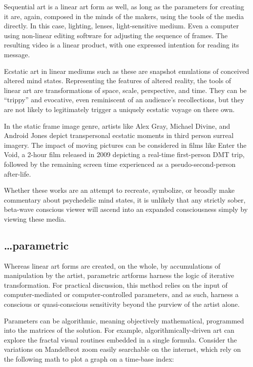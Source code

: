 \documentclass{UIdahoMastersThesis}
\begin{document}
Sequential art is a linear art form as well, as long as the parameters for creating it are, again, composed in the minds of the makers, using the tools of the media directly. In this case, lighting, lenses, light-sensitive medium. Even a computer using non-linear editing software for adjusting the sequence of frames. The resulting video is a linear product, with one expressed intention for reading its message.

Ecstatic art in linear mediums such as these are snapshot emulations of conceived altered mind states. Representing the features of altered reality, the tools of linear art are transformations of space, scale, perspective, and time. They can be ``trippy'' and evocative, even reminiscent of an audience's recollections, but they are not likely to legitimately trigger a uniquely ecstatic voyage on there own.  

In the static frame image genre, artists like Alex Gray, Michael Divine, and Android Jones depict transpersonal ecstatic moments in third person surreal imagery. The impact of moving pictures can be considered in films like Enter the Void, a 2-hour film released in 2009 depicting a real-time first-person DMT trip, followed by the remaining screen time experienced as a pseudo-second-person after-life.

Whether these works are an attempt to recreate, symbolize, or broadly make commentary about psychedelic mind states, it is unlikely that any strictly sober, beta-wave conscious viewer will ascend into an expanded consciousness simply by viewing these media.

\subsection*{\ldots parametric}

Whereas linear art forms are created, on the whole, by accumulations of manipulation by the artist, parametric artforms harness the logic of iterative transformation. For practical discussion, this method relies on the input of computer-mediated or computer-controlled parameters, and as such, harness a conscious or quasi-conscious sensitivity beyond the purview of the artist alone. 

Parameters can be algorithmic, meaning objectively mathematical, programmed into the matrices of the solution. For example, algorithmically-driven art can explore the fractal visual routines embedded in a single formula. Consider the variations on Mandelbrot zoom easily searchable on the internet, which rely on the following math to plot a graph on a time-base index: 
\end{document}
